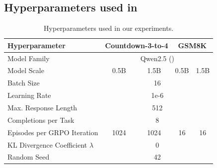 \documentclass{article} %
\theoremstyle{definition}
\begin{document}
\subsection{Hyperparameters used in \cite{wk10}}
\label{tab:wk10-hyperparams}
\begin{table}[h]
    \centering
    \begin{tabular}{|l|c|c|c|c|}
        \hline
        \textbf{Hyperparameter} & \multicolumn{2}{c|}{\textbf{Countdown-3-to-4}} & \multicolumn{2}{|c|}{\textbf{GSM8K}} \\
        \hline
        Model Family & \multicolumn{4}{c|}{Qwen2.5 (\cite{Qwen-et-al-2025})} \\
        \hline
        Model Scale & 0.5B & 1.5B & 0.5B & 1.5B \\
        \hline
        Batch Size & \multicolumn{4}{c|}{16} \\
        \hline
        Learning Rate & \multicolumn{4}{c|}{1e-6} \\
        \hline
        Max. Response Length & \multicolumn{4}{c|}{512} \\
        \hline
        Completions per Task & \multicolumn{4}{c|}{8} \\
        \hline
        Episodes per GRPO Iteration & 1024 & 1024 & 16 & 16\\
        \hline
        KL Divergence Coefficient $\lambda$ & \multicolumn{4}{c|}{0} \\
        \hline
        Random Seed & \multicolumn{4}{c|}{42} \\
        \hline
    \end{tabular}
    \caption{Hyperparameters used in our experiments.}
    \label{tab:hyperparams}
\end{table}
\end{document}
